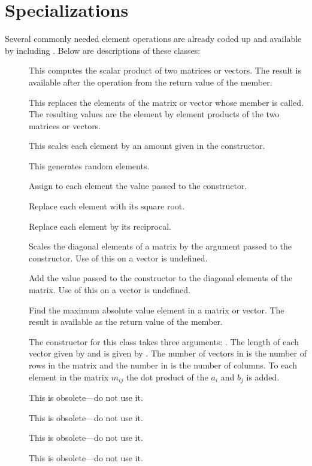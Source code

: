\section{ Specializations}

Several commonly needed element operations are already coded
up and available by including .
Below are descriptions of these classes:

\begin{description}
\item[] This  computes
the scalar product of two matrices or vectors.  The result is available
after the operation from the return value of the  member.
\item[] This 
replaces the elements of the matrix or vector whose 
member is called.  The resulting values are the element by element products
of the two matrices or vectors.
\item[] This scales each element by an amount given
in the constructor.
\item[] This generates random elements.
\item[] Assign to each element the value passed to
the constructor.
\item[] Replace each element with its square
root.
\item[] Replace each element by its reciprocal.
\item[] Scales the diagonal elements of a
matrix by the argument passed to the constructor.  Use of this on a vector
is undefined.
\item[] Add the value passed to the
constructor to the diagonal elements of the matrix.  Use of this on a
vector is undefined.
\item[] Find the maximum absolute value element in a
matrix or vector.  The result is available as the return value of the
 member.
\item[] The constructor for this class takes three
arguments: \linebreak {}.  The length of each vector given by
 and  is given by .  The number of vectors in
 is the number of rows in the matrix and the number in  is
the number of columns.  To each element in the matrix $m_{ij}$ the dot
product of the $a_i$ and $b_j$ is added.
\item[]  This is obsolete---do not use it.
\item[] This is obsolete---do not
use it.
\item[] This is obsolete---do not
use it.
\item[] This is obsolete---do not use
it.
\end{description}

